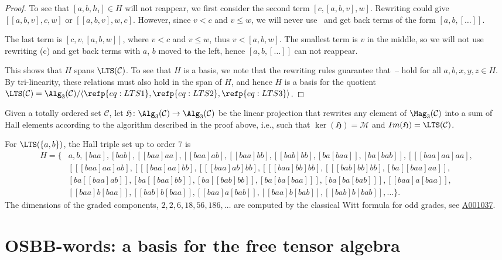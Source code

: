 \documentclass[pdftex]{sigma}
\numberwithin{equation}{section}
\begin{document}
\begin{proof}
To see that $[a,b,h_i]\in H$ will not reappear, we first consider the second term $[c,[a,b,v],w]$. Rewriting could give
$[[a,b,v],c,w]$ or $[[a,b,v],w,c]$. However, since $v<c$ and $v\leq w$, we will never use~ and get back terms of the form $[a,b,[\dots]]$.

The last term is $[c,v,[a,b,w]]$, where $v<c$ and $v\leq w$, thus $v<[a,b,w]$. The smallest term is $v$ in the middle, so we
will not use rewriting (c)
and get back terms with $a$, $b$ moved to the left, hence $[a,b,[\dots]]$ can not reappear.

This shows that $H$ spans $\LTS(\mathcal{C})$. To see that $H$ is a basis, we note that the rewriting rules guarantee that~-- hold for all $a,b,x,y,z\in H$. By tri-linearity, these relations must also hold in the span of $H$, and hence $H$ is a basis for the quotient $\LTS(\mathcal{C}) = \Alg_3(\mathcal{C})/\langle \refp{eq:LTS1},\refp{eq:LTS2},\refp{eq:LTS3}\rangle$.
\end{proof}

\begin{Definition}\label{def:Hall_map}
Given a totally ordered set $\mathcal{C}$, let $\mathfrak{H} \colon \Alg_3 (\mathcal{C}) \rightarrow \Alg_3(\mathcal{C})$ be the linear projection that rewrites any element of $\Mag_3(\mathcal{C})$ into a sum of Hall elements according to the algorithm described in the proof above, i.e., such that $\ker(\mathfrak{H}) = \mathcal{M}$ and $Im(\mathfrak{H}) = \LTS(\mathcal{C})$.
\end{Definition}


For $\LTS(\{a,b\})$, the Hall triple set up to order 7 is
\begin{align*}
H = \{{}&a, b,
[baa], [bab],
[[baa]aa], [[baa]ab],
[[baa]bb], [[bab]bb], [ba[baa]],
[ba[bab]],
[[[baa]aa]aa], \\ &{} [[[baa]aa]ab], [[[baa]aa]bb],
[[[baa]ab]bb], [[[baa]bb]bb], [[[bab]bb]bb],
[ba[[baa]aa]], \\ &{}
[ba[[baa]ab]],[ba[[baa]bb]], [ba[[bab]bb]],
[ba[ba[baa]]], [ba[ba[bab]]],
[[baa]a[baa]],
\\ &{}
[[baa]b[baa]],
[[bab]b[baa]], [[baa]a[bab]],
[[baa]b[bab]], [[bab]b[bab]], \dots\} .
\end{align*}
The dimensions of the graded components, $2, 2, 6, 18, 56, 186, \dots$ are computed by the classical Witt formula for odd grades, see \href{https://oeis.org/A001037}{A001037}.




\section{OSBB-words: a basis for the free tensor algebra}\label{sec:OSBB}
\end{document}
